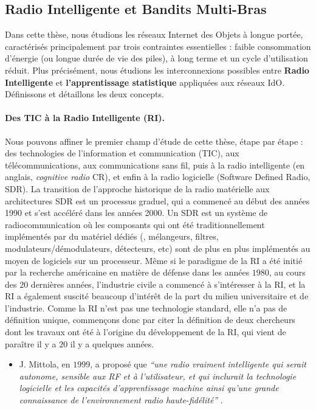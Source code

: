 \begin{resume_fr}
\section*{Radio Intelligente et Bandits Multi-Bras}

Dans cette thèse, nous étudions les réseaux Internet des Objets à longue portée, caractérisés principalement par trois contraintes essentielles :
faible consommation d'énergie (ou longue durée de vie des piles),
à long terme
et un cycle d'utilisation réduit.
%
Plus précisément, nous étudions les interconnexions possibles entre \textbf{Radio Intelligente} et \textbf{l'apprentissage statistique} appliquées aux réseaux IdO.
Définissons et détaillons les deux concepts.


\paragraph{Des TIC à la Radio Intelligente (RI).}
%
Nous pouvons affiner le premier champ d'étude de cette thèse, étape par étape :
des technologies de l'information et communication (TIC), aux télécommunications, aux communications sans fil, puis à la radio intelligente (en anglais, \emph{cognitive radio} CR),
et enfin à la radio logicielle (Software Defined Radio, SDR).
%
La transition de l'approche historique de la radio matérielle aux architectures SDR est un processus graduel, qui a commencé au début des années 1990 et s'est accéléré dans les années 2000.
Un SDR est un système de radiocommunication où les composants qui ont été traditionnellement implémentés par du matériel dédiés (\eg, mélangeurs, filtres, modulateurs/démodulateurs, détecteurs, etc) sont de plus en plus implémentés au moyen de logiciels sur un processeur.
%
Même si le paradigme de la RI a été initié par la recherche américaine en matière de défense dans les années $1980$, au cours des $20$ dernières années, l'industrie civile a commencé à s'intéresser à la RI, et la RI a également suscité beaucoup d'intérêt de la part du milieu universitaire et de l'industrie.
%
Comme la RI n'est pas une technologie standard, elle n'a pas de définition unique, commençons donc par citer la définition de deux chercheurs dont les travaux ont été à l'origine du développement de la RI, qui vient de paraître il y a $20$ il y a quelques années.
%
\begin{itemize}
    \item
    J. Mittola, en $1999$, a proposé que
    \emph{``une radio vraiment intelligente qui serait autonome, sensible aux RF et à l'utilisateur, et qui inclurait la technologie logicielle et les capacités d'apprentissage machine ainsi qu'une grande connaissance de l'environnement radio haute-fidélité''} \cite{Mitola99}.


\end{itemize}
\end{resume_fr}
